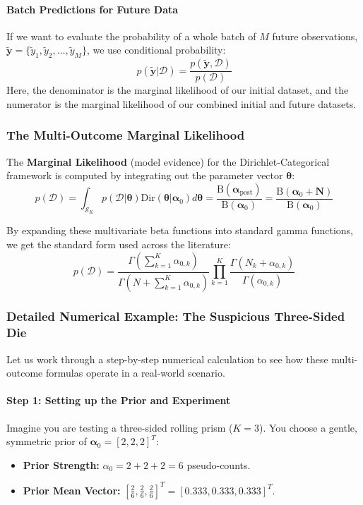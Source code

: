 \documentclass{article}
\begin{document}
\paragraph{Batch Predictions for Future Data}
If we want to evaluate the probability of a whole batch of $M$ future observations, $\tilde{\mathbf{y}} = \{\tilde{y}_1, \tilde{y}_2, \dots, \tilde{y}_M\}$, we use conditional probability:
\begin{equation}
p(\tilde{\mathbf{y}}|\mathcal{D}) = \frac{p(\tilde{\mathbf{y}}, \mathcal{D})}{p(\mathcal{D})}
\end{equation}
Here, the denominator is the marginal likelihood of our initial dataset, and the numerator is the marginal likelihood of our combined initial and future datasets.

\subsubsection{The Multi-Outcome Marginal Likelihood}
The \textbf{Marginal Likelihood} (model evidence) for the Dirichlet-Categorical framework is computed by integrating out the parameter vector $\boldsymbol{\theta}$:
\begin{equation}
p(\mathcal{D}) = \int_{\mathcal{S}_K} p(\mathcal{D}|\boldsymbol{\theta})\text{Dir}(\boldsymbol{\theta}|\boldsymbol{\alpha}_0) d\boldsymbol{\theta} = \frac{\text{B}(\boldsymbol{\alpha}_{\text{post}})}{\text{B}(\boldsymbol{\alpha}_0)} = \frac{\text{B}(\boldsymbol{\alpha}_0 + \mathbf{N})}{\text{B}(\boldsymbol{\alpha}_0)}
\end{equation}

By expanding these multivariate beta functions into standard gamma functions, we get the standard form used across the literature:
\begin{equation}
p(\mathcal{D}) = \frac{\Gamma\left(\sum_{k=1}^K \alpha_{0,k}\right)}{\Gamma\left(N + \sum_{k=1}^K \alpha_{0,k}\right)} \prod_{k=1}^K \frac{\Gamma(N_k + \alpha_{0,k})}{\Gamma(\alpha_{0,k})}
\end{equation}

\subsubsection{Detailed Numerical Example: The Suspicious Three-Sided Die}

Let us work through a step-by-step numerical calculation to see how these multi-outcome formulas operate in a real-world scenario.

\paragraph{Step 1: Setting up the Prior and Experiment}
Imagine you are testing a three-sided rolling prism ($K=3$). You choose a gentle, symmetric prior of $\boldsymbol{\alpha}_0 = [2, 2, 2]^T$:
\begin{itemize}
    \item \textbf{Prior Strength:} $\alpha_0 = 2 + 2 + 2 = 6$ pseudo-counts.
    \item \textbf{Prior Mean Vector:} $[\frac{2}{6}, \frac{2}{6}, \frac{2}{6}]^T = [0.333, 0.333, 0.333]^T$.
\end{itemize}
\end{document}
